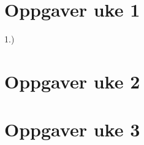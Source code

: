 \documentclass[12pt]{article}
\begin{document}
 

\section{Oppgaver uke 1}
1.)

\section{Oppgaver uke 2}


\section{Oppgaver uke 3}

% 
%
%
\end{document}
